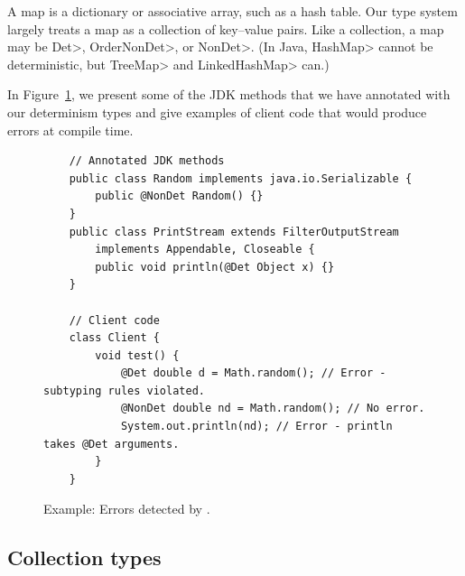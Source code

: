 A map is a dictionary or associative array, such as a hash table.
Our type system largely treats a map as a collection of key--value pairs.  Like a
collection, a map may be \<Det>, \<OrderNonDet>, or \<NonDet>.  (In Java,
\<HashMap> cannot be deterministic, but \<TreeMap> and \<LinkedHashMap>
can.)


In Figure~\ref{code-determinism}, we present some of the JDK methods that we have annotated with our determinism types and give examples of
client code that would produce errors at compile time.
\begin{figure}
    \begin{verbatim}
    // Annotated JDK methods
    public class Random implements java.io.Serializable {
        public @NonDet Random() {}
    }
    public class PrintStream extends FilterOutputStream 
        implements Appendable, Closeable {
        public void println(@Det Object x) {}
    }
    
    // Client code
    class Client {
        void test() {
            @Det double d = Math.random(); // Error - subtyping rules violated.
            @NonDet double nd = Math.random(); // No error.
            System.out.println(nd); // Error - println takes @Det arguments.
        }
    }
    \end{verbatim}
    \caption{Example: Errors detected by \theDeterminismChecker.}
    \label{code-determinism}
\end{figure}


\subsection{Collection types}\label{collection-rules}


